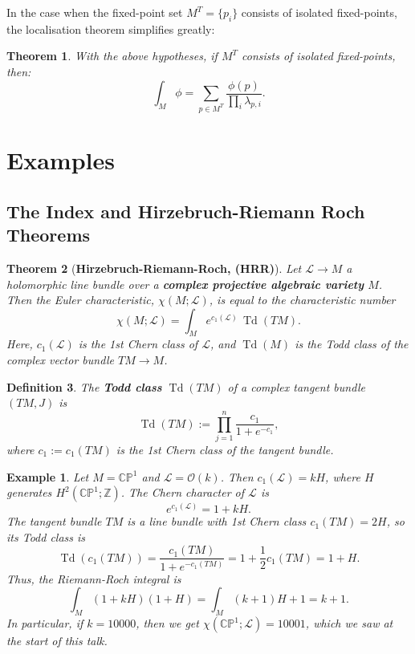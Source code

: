 \documentclass{article}
\newtheorem{theorem}{Theorem}[section]
\newtheorem{defn}[theorem]{Definition\rm}
\newtheorem{example}{Example}
\newcommand{\ra}{\rightarrow}
\newcommand{\PP}{\mathbb{P}}
\newcommand{\CC}{\mathbb{C}}
\newcommand{\ZZ}{\mathbb{Z}}
\newcommand{\mcL}{\mathcal{L}}
\newcommand{\mcO}{\mathcal{O}}
\DeclareMathOperator{\Td}{Td}
\begin{document}
In the case when the fixed-point set $M^{T} = \{p_{i}\}$ consists of isolated fixed-points, the localisation theorem simplifies greatly:

\begin{theorem}
	With the above hypotheses, if $M^{T}$ consists of isolated fixed-points, then:
	\begin{equation*}
		\int_{M} \phi = \sum\limits_{p \in M^{T}} \frac{\phi(p)}{\prod_{i} \lambda_{p, i}}.
	\end{equation*}
\end{theorem}


\section{Examples}


\subsection{The Index and Hirzebruch-Riemann Roch Theorems}

\begin{theorem}[\textbf{Hirzebruch-Riemann-Roch, (HRR)}]
	Let $\mcL \ra M$ a holomorphic line bundle over a \textbf{complex projective algebraic variety} $M$. Then the Euler characteristic, $\chi(M; \mcL)$, is equal to the characteristic number
	\begin{equation*}
		\chi(M; \mcL) =	\int_{M} e^{c_{1}(\mcL)}\, \Td(TM).
	\end{equation*}
	Here, $c_{1}(\mcL)$ is the \emph{1st Chern class} of $\mcL$, and $\Td(M)$ is the \emph{Todd class} of the complex vector bundle $TM \ra M$.
\end{theorem}

\begin{defn}
	The \textbf{Todd class} $\Td(TM)$ of a complex tangent bundle $(TM, J)$ is
	\begin{equation*}
		\Td(TM) := \prod_{j = 1}^{n} \frac{c_{1}}{1 + e^{-c_{1}}},
	\end{equation*}
	where $c_{1} := c_{1}(TM)$ is the 1st Chern class of the tangent bundle.
\end{defn}

\begin{example}
	Let $M = \CC\PP^{1}$ and $\mcL = \mcO(k)$. Then $c_{1}(\mcL) = kH$, where $H$ generates $H^{2}(\CC\PP^{1}; \ZZ)$. The Chern character of $\mcL$ is
	\begin{equation*}
		e^{c_{1}(\mcL)} = 1 + kH.
	\end{equation*}
	The tangent bundle $TM$ is a line bundle with 1st Chern class $c_{1}(TM) = 2H$, so its Todd class is
	\begin{equation*}
		\Td(c_{1}(TM)) = \frac{c_{1}(TM)}{1 + e^{-c_{1}(TM)}} = 1 + \frac{1}{2}c_{1}(TM) = 1 + H.
	\end{equation*}
	Thus, the Riemann-Roch integral is
	\begin{equation*}
		\int_{M} (1 + kH)(1 + H) = \int_{M} (k+1)H + 1 = k+1.
	\end{equation*}
	In particular, if $k = 10000$, then we get $\chi(\CC\PP^{1}; \mcL) = 10001$, which we saw at the start of this talk.
\end{example}
\end{document}
